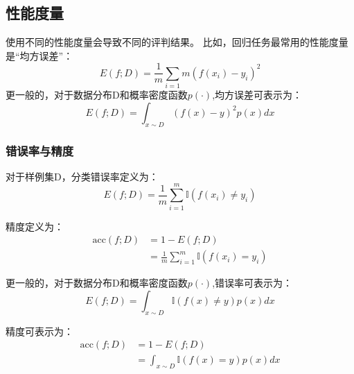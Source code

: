 \subsection{性能度量}
使用不同的性能度量会导致不同的评判结果。
比如，回归任务最常用的性能度量是“均方误差”：
\begin{equation}
    E(f;D)=\frac{1}{m}\sum_{i=1}{m}(f(x_i)-y_i)^2
\end{equation}
更一般的，对于数据分布D和概率密度函数$p(\cdot)$,均方误差可表示为：
\begin{equation}
    E(f;D)=\int_{x\sim D} (f(x)-y)^2 p(x)dx
\end{equation}
\subsubsection{错误率与精度}
对于样例集D，分类错误率定义为：
\begin{equation}
    E(f;D)=\frac{1}{m}\sum_{i=1}^{m} \mathbb{I}(f(x_i)\neq y_i)
\end{equation}

精度定义为：
\begin{align}
   \text{acc}(f;D) &= 1 - E(f;D) \nonumber \\
    &= \frac{1}{m} \sum_{i=1}^{m} \mathbb{I}(f(x_i) = y_i)
\end{align}

更一般的，对于数据分布D和概率密度函数$p(\cdot)$,错误率可表示为：
\begin{equation}
    E(f;D)=\int_{x\sim D} \mathbb{I}(f(x)\neq y) p(x)dx
\end{equation}

精度可表示为：
\begin{align}
    \text{acc}(f;D) &= 1 - E(f;D) \nonumber \\
    &= \int_{x\sim D} \mathbb{I}(f(x) = y) p(x)dx
\end{align}
